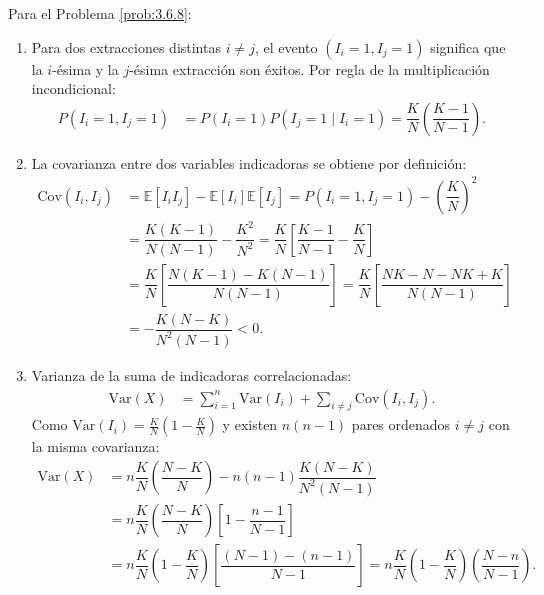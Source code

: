 \begin{solucion}
	\label{sol:3.6.8}
	Para el Problema \ref{prob:3.6.8}:
	\begin{enumerate}
		\item Para dos extracciones distintas $i \neq j$, el evento $(I_i = 1, I_j = 1)$ significa que la $i$-ésima y la $j$-ésima extracción son éxitos. Por regla de la multiplicación incondicional:
		\begin{align*}
			P(I_i = 1, I_j = 1) &= P(I_i = 1) P(I_j = 1 \mid I_i = 1) = \dfrac{K}{N} \left(\dfrac{K-1}{N-1}\right).
		\end{align*}
		\item La covarianza entre dos variables indicadoras se obtiene por definición:
		\begin{align*}
			\text{Cov}(I_i, I_j) &= \mathbb{E}[I_i I_j] - \mathbb{E}[I_i]\mathbb{E}[I_j] = P(I_i = 1, I_j = 1) - \left(\dfrac{K}{N}\right)^2 \\
			&= \dfrac{K(K-1)}{N(N-1)} - \dfrac{K^2}{N^2} = \dfrac{K}{N} \left[ \dfrac{K-1}{N-1} - \dfrac{K}{N} \right] \\
			&= \dfrac{K}{N} \left[ \dfrac{N(K-1) - K(N-1)}{N(N-1)} \right] = \dfrac{K}{N} \left[ \dfrac{NK - N - NK + K}{N(N-1)} \right] \\
			&= -\dfrac{K(N-K)}{N^2(N-1)} < 0.
		\end{align*}
		\item Varianza de la suma de indicadoras correlacionadas:
		\begin{align*}
			\text{Var}(X) &= \sum_{i=1}^n \text{Var}(I_i) + \sum_{i \neq j} \text{Cov}(I_i, I_j).
		\end{align*}
		Como $\text{Var}(I_i) = \frac{K}{N}\left(1 - \frac{K}{N}\right)$ y existen $n(n-1)$ pares ordenados $i \neq j$ con la misma covarianza:
		\begin{align*}
			\text{Var}(X) &= n \dfrac{K}{N}\left(\dfrac{N-K}{N}\right) - n(n-1) \dfrac{K(N-K)}{N^2(N-1)} \\
			&= n \dfrac{K}{N}\left(\dfrac{N-K}{N}\right) \left[ 1 - \dfrac{n-1}{N-1} \right] \\
			&= n \dfrac{K}{N}\left(1 - \dfrac{K}{N}\right) \left[ \dfrac{(N-1) - (n-1)}{N-1} \right] = n \dfrac{K}{N}\left(1 - \dfrac{K}{N}\right) \left(\dfrac{N-n}{N-1}\right).
		\end{align*}
	\end{enumerate}
\end{solucion}

